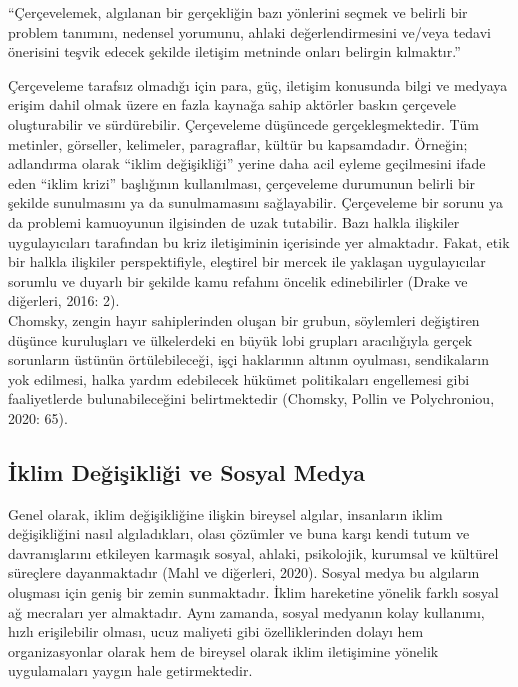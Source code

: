 \documentclass[
]{book}
\begin{document}
``Çerçevelemek, algılanan bir gerçekliğin bazı yönlerini seçmek ve belirli bir problem tanımını, nedensel yorumunu, ahlaki değerlendirmesini ve/veya tedavi önerisini teşvik edecek şekilde iletişim metninde onları belirgin kılmaktır.''

Çerçeveleme tarafsız olmadığı için para, güç, iletişim konusunda bilgi ve medyaya erişim dahil olmak üzere en fazla kaynağa sahip aktörler baskın çerçevele oluşturabilir ve sürdürebilir. Çerçeveleme düşüncede gerçekleşmektedir. Tüm metinler, görseller, kelimeler, paragraflar, kültür bu kapsamdadır. Örneğin; adlandırma olarak ``iklim değişikliği'' yerine daha acil eyleme geçilmesini ifade eden ``iklim krizi'' başlığının kullanılması, çerçeveleme durumunun belirli bir şekilde sunulmasını ya da sunulmamasını sağlayabilir. Çerçeveleme bir sorunu ya da problemi kamuoyunun ilgisinden de uzak tutabilir. Bazı halkla ilişkiler uygulayıcıları tarafından bu kriz iletişiminin içerisinde yer almaktadır. Fakat, etik bir halkla ilişkiler perspektifiyle, eleştirel bir mercek ile yaklaşan uygulayıcılar sorumlu ve duyarlı bir şekilde kamu refahını öncelik edinebilirler (Drake ve diğerleri, 2016: 2).\\
Chomsky, zengin hayır sahiplerinden oluşan bir grubun, söylemleri değiştiren düşünce kuruluşları ve ülkelerdeki en büyük lobi grupları aracılığıyla gerçek sorunların üstünün örtülebileceği, işçi haklarının altının oyulması, sendikaların yok edilmesi, halka yardım edebilecek hükümet politikaları engellemesi gibi faaliyetlerde bulunabileceğini belirtmektedir (Chomsky, Pollin ve Polychroniou, 2020: 65).

\hypertarget{iklim-deux11fiux15fikliux11fi-ve-sosyal-medya}{%
\subsection{İklim Değişikliği ve Sosyal Medya}\label{iklim-deux11fiux15fikliux11fi-ve-sosyal-medya}}

Genel olarak, iklim değişikliğine ilişkin bireysel algılar, insanların iklim değişikliğini nasıl algıladıkları, olası çözümler ve buna karşı kendi tutum ve davranışlarını etkileyen karmaşık sosyal, ahlaki, psikolojik, kurumsal ve kültürel süreçlere dayanmaktadır (Mahl ve diğerleri, 2020). Sosyal medya bu algıların oluşması için geniş bir zemin sunmaktadır. İklim hareketine yönelik farklı sosyal ağ mecraları yer almaktadır. Aynı zamanda, sosyal medyanın kolay kullanımı, hızlı erişilebilir olması, ucuz maliyeti gibi özelliklerinden dolayı hem organizasyonlar olarak hem de bireysel olarak iklim iletişimine yönelik uygulamaları yaygın hale getirmektedir.
\end{document}

